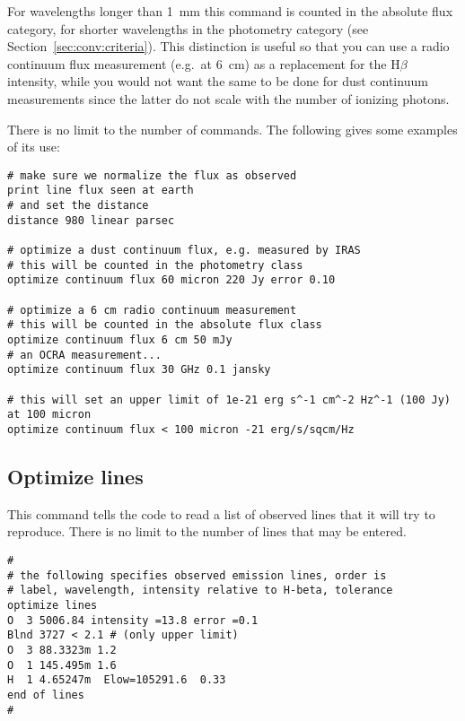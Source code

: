 For wavelengths longer than 1~mm this command is counted in the
absolute flux category, for shorter wavelengths in the photometry category (see
Section~\ref{sec:conv:criteria}). This distinction is useful so that you can
use a radio continuum flux measurement (e.g.\ at 6~cm) as a replacement for
the H$\beta$ intensity, while you would not want the same to be done for dust
continuum measurements since the latter do not scale with the number of
ionizing photons.

There is no limit to the number of 
commands. The following gives some examples of its use:
\begin{verbatim}
# make sure we normalize the flux as observed
print line flux seen at earth
# and set the distance
distance 980 linear parsec

# optimize a dust continuum flux, e.g. measured by IRAS
# this will be counted in the photometry class
optimize continuum flux 60 micron 220 Jy error 0.10

# optimize a 6 cm radio continuum measurement
# this will be counted in the absolute flux class
optimize continuum flux 6 cm 50 mJy
# an OCRA measurement...
optimize continuum flux 30 GHz 0.1 jansky

# this will set an upper limit of 1e-21 erg s^-1 cm^-2 Hz^-1 (100 Jy) at 100 micron
optimize continuum flux < 100 micron -21 erg/s/sqcm/Hz
\end{verbatim}

\subsection{Optimize lines}

This command tells the code to read a list of observed lines that it
will try to reproduce.
There is no limit to the number of lines that may be entered.
\begin{verbatim}
#
# the following specifies observed emission lines, order is
# label, wavelength, intensity relative to H-beta, tolerance
optimize lines
O  3 5006.84 intensity =13.8 error =0.1
Blnd 3727 < 2.1 # (only upper limit)
O  3 88.3323m 1.2
O  1 145.495m 1.6
H  1 4.65247m  Elow=105291.6  0.33
end of lines
#
\end{verbatim}

